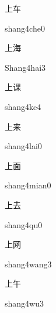 \begin{verbete}{上车}
\begin{pronuncia}{shang4che0}
\end{pronuncia}
\end{verbete}

\begin{verbete}{上海}
\begin{pronuncia}{Shang4hai3}
\end{pronuncia}
\end{verbete}

\begin{verbete}[shang4ke4]{上课}
\begin{pronuncia}{shang4ke4}
\end{pronuncia}
\end{verbete}

\begin{verbete}{上来}
\begin{pronuncia}{shang4lai0}
\end{pronuncia}
\end{verbete}

\begin{verbete}{上面}
\begin{pronuncia}{shang4mian0}
\end{pronuncia}
\end{verbete}

\begin{verbete}[shang4qu0]{上去}
\begin{pronuncia}{shang4qu0}
\end{pronuncia}
\end{verbete}

\begin{verbete}{上网}
\begin{pronuncia}{shang4wang3}
\end{pronuncia}
\end{verbete}

\begin{verbete}[shang4wu3]{上午}
\begin{pronuncia}{shang4wu3}
\end{pronuncia}
\end{verbete}

